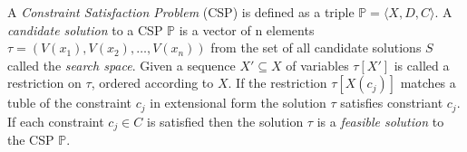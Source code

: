 A \emph{Constraint Satisfaction Problem} (CSP) is defined as a triple $\mathbb{P} = \langle X,D,C \rangle$. A 
\emph{candidate solution} to a CSP $\mathbb{P}$ is a vector of n elements 
$\tau = (V(x_1), V(x_2), \dots , V(x_n))$ from the set of all candidate solutions $S$ called the \emph{search space}.  
Given a sequence $X' \subseteq X$ of variables $\tau[X']$ is called a restriction on $\tau$, ordered according to 
$X$. If the restriction $\tau[X(c_j)]$ matches a tuble of the constraint $c_j$ in extensional form the solution $\tau$ 
satisfies constriant $c_j$. If each constraint $c_j \in C$ is satisfied then the solution $\tau$ is a \emph{feasible 
solution} to the CSP $\mathbb{P}$. \\

